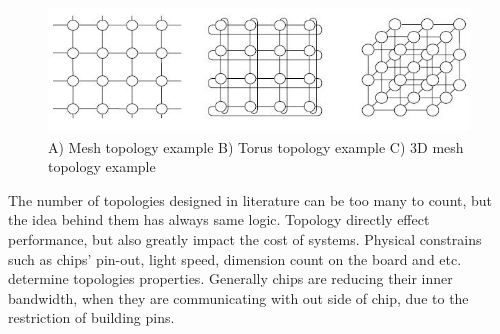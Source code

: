           \begin{figure}[h!]
            \centering
            \includegraphics[width=1\textwidth]{img/multidimensional.jpg}
            \caption{A) Mesh topology example B) Torus topology example C) 3D mesh  topology example\cite{HPCfigure}}
            \label{fig:meshestorus}
        \end{figure}
        The number of topologies designed in literature can be too many to count, but the idea behind them has always same logic. Topology directly effect performance, but also greatly impact the cost of systems. Physical constrains such as chips' pin-out, light speed, dimension count on the board and etc. determine topologies properties. Generally chips are reducing their inner bandwidth, when they are communicating with out side of chip, due to the restriction of building pins\cite{hennessy2012computer}.
